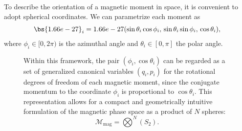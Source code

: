 To describe the orientation of a magnetic moment in space, it is convenient to adopt spherical coordinates.
We can parametrize each moment as
\[
    \bs{\mu}_i = \mu (\sin\theta_i \cos\phi_i,\, \sin\theta_i \sin\phi_i,\, \cos\theta_i),
\]
where \(\phi_i \in [0, 2\pi)\) is the azimuthal angle and \(\theta_i \in [0, \pi]\) the polar angle.
\begin{figure}[H]
    \begin{minipage}[b]{0.55\textwidth}
        Within this framework, the pair \((\phi_i, \cos\theta_i)\) can be regarded as a set of generalized canonical variables \((q_i, p_i)\) for the rotational degrees of freedom of each magnetic moment, since the conjugate momentum to the coordinate \(\phi_i\) is proportional to \(\cos\theta_i\).
        This representation allows for a compact and geometrically intuitive formulation of the magnetic phase space as a product of \(N\) spheres:
        \[
            \mathcal{M}_{\text{mag}} = \bigotimes^N(S_2).
        \]
    \end{minipage}
    \hfill
    \begin{minipage}[b]{0.4\textwidth}
        \centering
    \end{minipage}
\end{figure}

